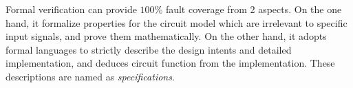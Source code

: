 Formal verification can provide $100\%$ fault coverage from 2 aspects. On the one hand,  it formalize properties
for the circuit model which are irrelevant to specific input signals,  and prove them mathematically.
On the other hand,  it adopts formal languages to strictly describe the design intents and detailed implementation, 
and deduces circuit function from the implementation. These descriptions are named as {\it specifications}.
